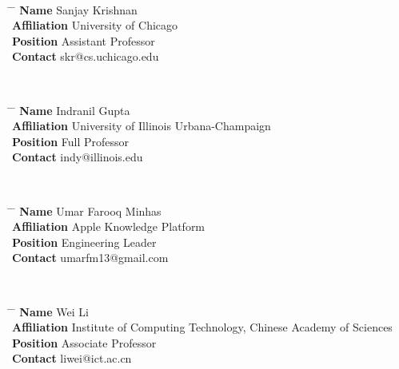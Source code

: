 \documentclass[10pt]{article} %
\begin{document}
\\
\parbox{0.5\textwidth}{ %
\begin{tabbing}
\hspace{2cm} \= \hspace{4cm} \= \kill %
{\bf Name} \> Sanjay Krishnan \\ %
{\bf Affiliation} \> University of Chicago \\ %
{\bf Position} \> Assistant Professor \\ %
{\bf Contact} \> skr@cs.uchicago.edu %
\end{tabbing}}
\\
\parbox{0.5\textwidth}{ %
\begin{tabbing}
\hspace{2cm} \= \hspace{4cm} \= \kill %
{\bf Name} \> Indranil Gupta \\ %
{\bf Affiliation} \> University of Illinois Urbana-Champaign \\ %
{\bf Position} \> Full Professor \\ %
{\bf Contact} \> indy@illinois.edu %
\end{tabbing}}
\\
\parbox{0.5\textwidth}{ %
\begin{tabbing}
\hspace{2cm} \= \hspace{4cm} \= \kill %
{\bf Name} \> Umar Farooq Minhas \\ %
{\bf Affiliation} \> Apple Knowledge Platform \\ %
{\bf Position} \> Engineering Leader \\ %
{\bf Contact} \> umarfm13@gmail.com %
\end{tabbing}}
\\
\parbox{0.5\textwidth}{ %
\begin{tabbing}
\hspace{2cm} \= \hspace{4cm} \= \kill %
{\bf Name} \> Wei Li\\ %
{\bf Affiliation} \> Institute of Computing Technology, Chinese Academy of Sciences\\ %
{\bf Position} \> Associate Professor \\ %
{\bf Contact} \> liwei@ict.ac.cn %
\end{tabbing}}
\hfill


\end{document}
